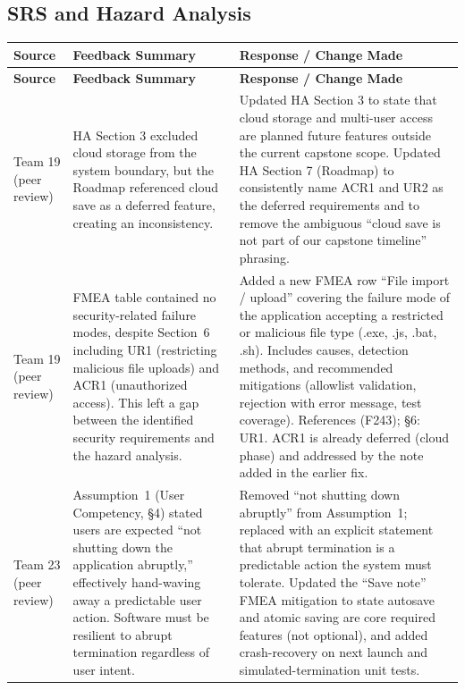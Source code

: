 \documentclass{article}
\begin{document}

\subsection{SRS and Hazard Analysis}

\begin{tabularx}{\textwidth}{>{\hsize=0.4\hsize}X >{\hsize=0.8\hsize}X >{\hsize=1.8\hsize}X}
\toprule
\textbf{Source} & \textbf{Feedback Summary} & \textbf{Response / Change Made} \\
\midrule
\endfirsthead
\toprule
\textbf{Source} & \textbf{Feedback Summary} & \textbf{Response / Change Made} \\
\midrule
\endhead
\bottomrule
\endfoot
Team 19 (peer review) &
  HA Section 3 excluded cloud storage from the system boundary, but the Roadmap referenced cloud save as a deferred feature, creating an inconsistency. &
  Updated HA Section 3 to state that cloud storage and multi-user access are planned future features outside the current capstone scope. Updated HA Section 7 (Roadmap) to consistently name ACR1 and UR2 as the deferred requirements and to remove the ambiguous ``cloud save is not part of our capstone timeline'' phrasing. \\
\midrule
Team 19 (peer review) &
  FMEA table contained no security-related failure modes, despite Section~6 including UR1 (restricting malicious file uploads) and ACR1 (unauthorized access). This left a gap between the identified security requirements and the hazard analysis. &
  Added a new FMEA row ``File import / upload'' covering the failure mode of the application accepting a restricted or malicious file type (.exe, .js, .bat, .sh). Includes causes, detection methods, and recommended mitigations (allowlist validation, rejection with error message, test coverage). References (F243); \S6: UR1. ACR1 is already deferred (cloud phase) and addressed by the note added in the earlier fix. \\
\midrule
Team 23 (peer review) &
  Assumption~1 (User Competency, §4) stated users are expected ``not shutting down the application abruptly,'' effectively hand-waving away a predictable user action. Software must be resilient to abrupt termination regardless of user intent. &
  Removed ``not shutting down abruptly'' from Assumption~1; replaced with an explicit statement that abrupt termination is a predictable action the system must tolerate. Updated the ``Save note'' FMEA mitigation to state autosave and atomic saving are core required features (not optional), and added crash-recovery on next launch and simulated-termination unit tests. \\

\end{tabularx}
\end{document}
